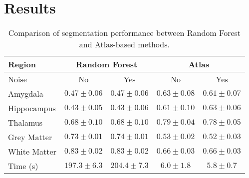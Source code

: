 \newcommand{\RNum}[1]{\uppercase\expandafter{\romannumeral #1\relax}}

\section{Results}

\setlength{\tabcolsep}{3pt}
\begin{table}[ht]
	\begin{flushleft}
		\caption{Comparison of segmentation performance between Random Forest and Atlas-based methods.}
		\begin{tabularx}{\linewidth}{Xcccc}
			\toprule
			\multirow{2}{*}{Region} & \multicolumn{2}{c}{Random Forest} & \multicolumn{2}{c}{Atlas} \\ 
			\cmidrule(lr){2-3} \cmidrule(lr){4-5}
			\midrule
			Noise & No & Yes & No & Yes \\
			Amygdala & $0.47 \pm 0.06$ & $0.47 \pm 0.06$ & $\mathbf{0.63 \pm 0.08}$ & $0.61 \pm 0.07$ \\
			Hippocampus & $0.43 \pm 0.05$ & $0.43 \pm 0.06$ & $0.61 \pm 0.10$ & $\mathbf{0.63 \pm 0.06}$ \\
			Thalamus & $0.68 \pm 0.10$ & $0.68 \pm 0.10$ & $\mathbf{0.79\pm 0.04}$ & $0.78 \pm 0.05$ \\
			Grey Matter & $0.73 \pm 0.01$ & $\mathbf{0.74 \pm 0.01}$ & $0.53 \pm 0.02 $ & $0.52 \pm 0.03$ \\
			White Matter & $\mathbf{0.83 \pm 0.02}$ & $\mathbf{0.83 \pm 0.02}$ & $0.66 \pm 0.03$ & $0.66 \pm 0.03$ \\
			Time (s)  & $197.3 \pm 6.3$  & $204.4 \pm 7.3$  & $6.0 \pm 1.8$  & $\mathbf{5.8 \pm 0.7}$ \\
			\bottomrule
		\end{tabularx}
	\end{flushleft}	
	\label{tab:performance_comparison}
\end{table}

